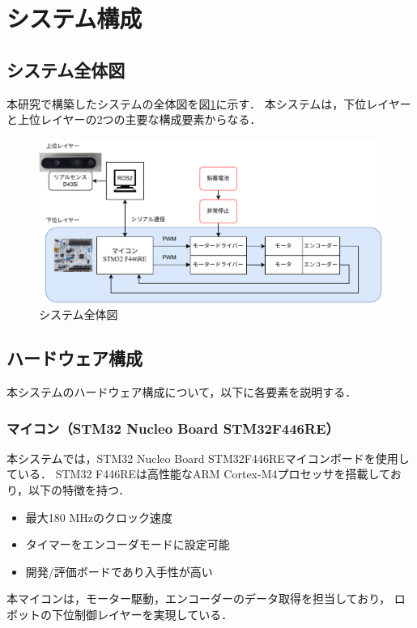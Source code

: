 \section{システム構成}
\subsection{システム全体図}
本研究で構築したシステムの全体図を図\ref{fig:system_diagram}に示す．
本システムは，下位レイヤーと上位レイヤーの2つの主要な構成要素からなる．

\begin{figure}[h]
    \centering
    \includegraphics[width=1.0\textwidth]{figure/system.pdf}
    \caption{システム全体図}
    \label{fig:system_diagram}
\end{figure}


\subsection{ハードウェア構成}
本システムのハードウェア構成について，以下に各要素を説明する．

\subsubsection{マイコン（STM32 Nucleo Board STM32F446RE）}
本システムでは，STM32 Nucleo Board STM32F446REマイコンボードを使用している．
STM32 F446REは高性能なARM Cortex-M4プロセッサを搭載しており，以下の特徴を持つ．
\begin{itemize}
    \item 最大180 MHzのクロック速度
    \item タイマーをエンコーダモードに設定可能
    \item 開発/評価ボードであり入手性が高い
\end{itemize}
本マイコンは，モーター駆動，エンコーダーのデータ取得を担当しており，
ロボットの下位制御レイヤーを実現している．



